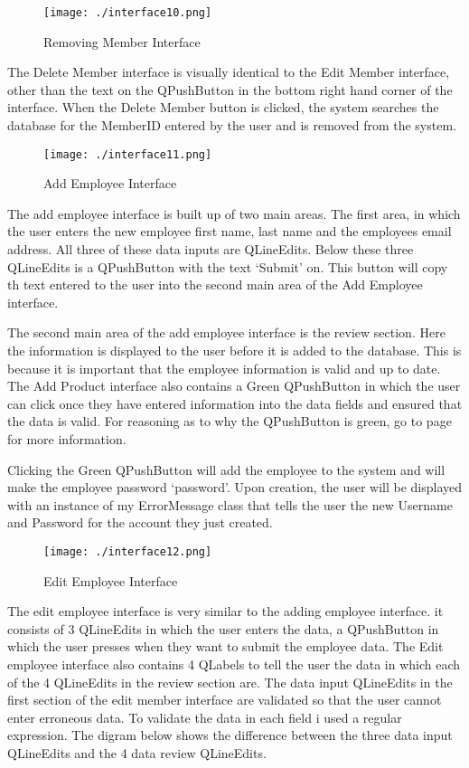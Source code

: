 \begin{figure}[H]
    \texttt{[image: ./interface10.png]}
    \caption{Removing Member Interface} \label{fig:removing-member-interface}
\end{figure}

The Delete Member interface is visually identical to the Edit Member interface, other than the text on the QPushButton in the bottom right hand corner of the interface. When the Delete Member button is clicked, the system searches the database for the MemberID entered by the user and is removed from the system.

\begin{figure}[H]
    \texttt{[image: ./interface11.png]}
    \caption{Add Employee Interface} \label{fig:adding-employee-interface}
\end{figure}

The add employee interface is built up of two main areas. The first area, in which the user enters the new employee first name, last name and the employees email address. All three of these data inputs are QLineEdits. Below these three QLineEdits is a QPushButton with the text `Submit' on. This button will copy th text entered to the user into the second main area of the Add Employee interface.

The second main area of the add employee interface is the review section. Here the information is displayed to the user before it is added to the database. This is because it is important that the employee information is valid and up to date. The Add Product interface also contains a Green QPushButton in which the user can click once they have entered information into the data fields and ensured that the data is valid. For reasoning as to why the QPushButton is green, go to page \pageref{fig:style} for more information.

Clicking the Green QPushButton will add the employee to the system and will make the employee password `password'. Upon creation, the user will be displayed with an instance of my ErrorMessage class that tells the user the new Username and Password for the account they just created. 


\begin{figure}[H]
    \texttt{[image: ./interface12.png]}
    \caption{Edit Employee Interface} \label{fig:edit-employee-interface}
\end{figure}

The edit employee interface is very similar to the adding employee interface. it consists of 3 QLineEdits in which the user enters the data, a QPushButton in which the user presses when they want to submit the employee data. The Edit employee interface also contains 4 QLabels to tell the user the data in which each of the 4 QLineEdits in the review section are. The data input QLineEdits in the first section of the edit member interface are validated so that the user cannot enter erroneous data. To validate the data in each field i used a regular expression. The digram below shows the difference between the three data input QLineEdits and the 4 data review QLineEdits.

